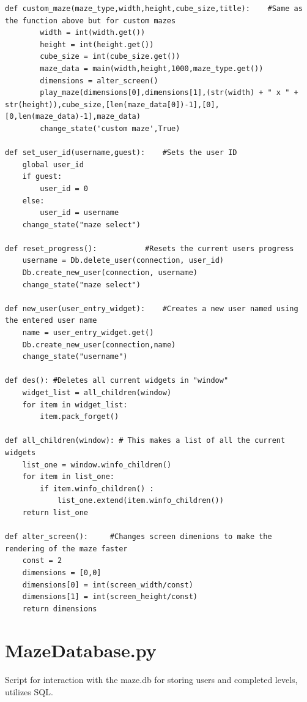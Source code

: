 \documentclass{article}
\begin{document}
\begin{lstlisting}
def custom_maze(maze_type,width,height,cube_size,title):    #Same as the function above but for custom mazes
        width = int(width.get())
        height = int(height.get())
        cube_size = int(cube_size.get())
        maze_data = main(width,height,1000,maze_type.get())
        dimensions = alter_screen()
        play_maze(dimensions[0],dimensions[1],(str(width) + " x " + str(height)),cube_size,[len(maze_data[0])-1],[0],[0,len(maze_data)-1],maze_data)
        change_state('custom maze',True)

def set_user_id(username,guest):    #Sets the user ID
    global user_id
    if guest:
        user_id = 0
    else:
        user_id = username
    change_state("maze select")

def reset_progress():           #Resets the current users progress
    username = Db.delete_user(connection, user_id)
    Db.create_new_user(connection, username)
    change_state("maze select")

def new_user(user_entry_widget):    #Creates a new user named using the entered user name
    name = user_entry_widget.get()
    Db.create_new_user(connection,name)
    change_state("username")

def des(): #Deletes all current widgets in "window"
    widget_list = all_children(window)
    for item in widget_list:
        item.pack_forget()

def all_children(window): # This makes a list of all the current widgets
    list_one = window.winfo_children()
    for item in list_one:
        if item.winfo_children() :
            list_one.extend(item.winfo_children())
    return list_one

def alter_screen():     #Changes screen dimenions to make the rendering of the maze faster
    const = 2
    dimensions = [0,0]
    dimensions[0] = int(screen_width/const)
    dimensions[1] = int(screen_height/const)
    return dimensions
\end{lstlisting}


\clearpage
\section{MazeDatabase.py}
Script for interaction with the maze.db for storing users and completed levels, utilizes SQL.
\end{document}
